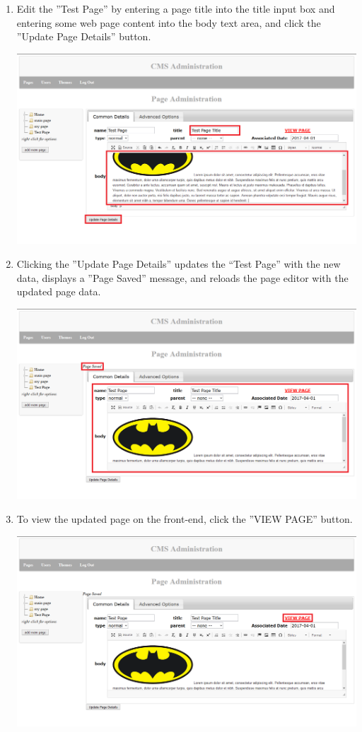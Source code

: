 \documentclass[12pt]{article}
\begin{document}
\begin{enumerate}
  \item Edit the ''Test Page'' by entering a page title into the title input box and entering some web page content into the body text area, and click the ''Update Page Details'' button. 
  
  \includegraphics[width=\textwidth,height=\textheight,keepaspectratio]{pics/editPage_4.png}
  
  \item Clicking the ''Update Page Details'' updates the “Test Page” with the new data, displays a ''Page Saved'' message, and reloads the page editor with the updated page data.
  
  \includegraphics[width=\textwidth,height=\textheight,keepaspectratio]{pics/editPage_5.png}
  
  \item To view the updated page on the front-end, click the ''VIEW PAGE'' button.
  
  \includegraphics[width=\textwidth,height=\textheight,keepaspectratio]{pics/editPage_6.png}
  

\end{enumerate}
\end{document}
